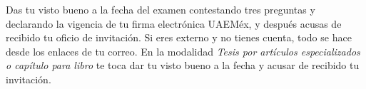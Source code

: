\documentclass[11pt,a4paper]{article}
\begin{document}
{\small\tableofcontents}
\newpage
\begin{quevasahacer}
Das tu visto bueno a la fecha del examen contestando tres preguntas y declarando la vigencia de tu firma electrónica UAEMéx, y después acusas de recibido tu oficio de invitación. Si eres externo y no tienes cuenta, todo se hace desde los enlaces de tu correo. En la modalidad \emph{Tesis por artículos especializados o capítulo para libro} te toca dar tu visto bueno a la fecha y acusar de recibido tu invitación.
\end{quevasahacer}




\end{document}
